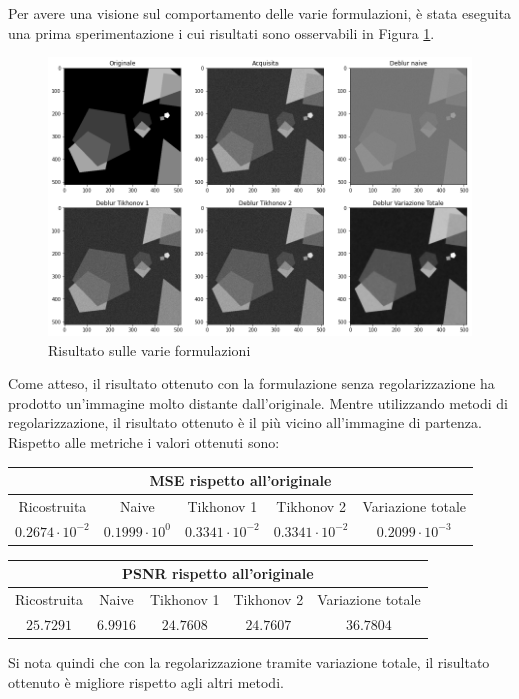 \documentclass[11pt]{article}
\begin{document}
Per avere una visione sul comportamento delle varie formulazioni, è stata eseguita una prima sperimentazione i cui risultati sono osservabili in Figura \ref{fig:deblur1}.\\
\begin{figure}[H]
    \centering
    \includegraphics[width=15cm]{deblur1.png}
    \caption{Risultato sulle varie formulazioni}
    \label{fig:deblur1}
\end{figure}
Come atteso, il risultato ottenuto con la formulazione senza regolarizzazione ha prodotto un'immagine molto distante dall'originale. 
Mentre utilizzando metodi di regolarizzazione, il risultato ottenuto è il più vicino all'immagine di partenza. \\
Rispetto alle metriche i valori ottenuti sono:
\begin{center}
    \begin{tabular}{ |c|c|c|c|c| }
    \hline
    \multicolumn{5}{|c|}{MSE rispetto all'originale} \\
    \hline
    Ricostruita & Naive & Tikhonov 1 & Tikhonov 2 & Variazione totale \\ 
    $0.2674 \cdot 10^{-2}$ & $0.1999 \cdot 10^{0}$ & $0.3341 \cdot 10^{-2}$ & $0.3341 \cdot 10^{-2}$ & $0.2099 \cdot 10^{-3}$ \\ 
    \hline
    \end{tabular}
\end{center}
\begin{center}
    \begin{tabular}{ |c|c|c|c|c| }
    \hline
    \multicolumn{5}{|c|}{PSNR rispetto all'originale} \\
    \hline
    Ricostruita & Naive & Tikhonov 1 & Tikhonov 2 & Variazione totale \\ 
    $25.7291$ & $6.9916$ & $24.7608$ & $24.7607$ & $36.7804$ \\ 
    \hline
    \end{tabular}
\end{center}
Si nota quindi che con la regolarizzazione tramite variazione totale, il risultato ottenuto è migliore rispetto agli altri metodi.
\end{document}
